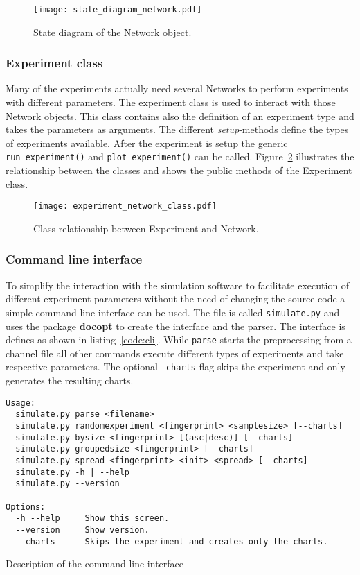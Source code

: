 \documentclass[final]{fhnwreport}       %
\begin{document}
\begin{figure}[H]
\centering
\texttt{[image: state\_diagram\_network.pdf]}
\caption{State diagram of the Network object.}
\label{fig:state_network}
\end{figure}

\subsubsection{Experiment class}
Many of the experiments actually need several Networks to perform experiments with different parameters. The experiment class is used to interact with those Network objects. This class contains also the definition of an experiment type and takes the parameters as arguments. The different \textit{setup}-methods define the types of experiments available. After the experiment is setup the generic \texttt{run_experiment()} and \texttt{plot_experiment()} can be called. Figure~\ref{fig:experiment_class} illustrates the relationship between the classes and shows the public methods of the Experiment class.

\begin{figure}[H]
\centering
\texttt{[image: experiment\_network\_class.pdf]}
\caption{Class relationship between Experiment and Network.}
\label{fig:experiment_class}
\end{figure}

\subsubsection{Command line interface}
To simplify the interaction with the simulation software to facilitate execution of different experiment parameters without the need of changing the source code a simple command line interface can be used. The file is called \texttt{simulate.py} and uses the package \textbf{docopt} to create the interface and the parser. The interface is defines as shown in listing~\ref{code:cli}. While \texttt{parse} starts the preprocessing from a channel file all other commands execute different types of experiments and take respective parameters. The optional \texttt{---charts} flag skips the experiment and only generates the resulting charts.

\begin{listing}[H]
  \begin{verbatim}
Usage:
  simulate.py parse <filename>
  simulate.py randomexperiment <fingerprint> <samplesize> [--charts]
  simulate.py bysize <fingerprint> [(asc|desc)] [--charts]
  simulate.py groupedsize <fingerprint> [--charts]
  simulate.py spread <fingerprint> <init> <spread> [--charts]
  simulate.py -h | --help
  simulate.py --version

Options:
  -h --help     Show this screen.
  --version     Show version.
  --charts      Skips the experiment and creates only the charts.

\end{verbatim}
\caption{Description of the command line interface}
\label{code:cli}
\end{listing}
\end{document}
